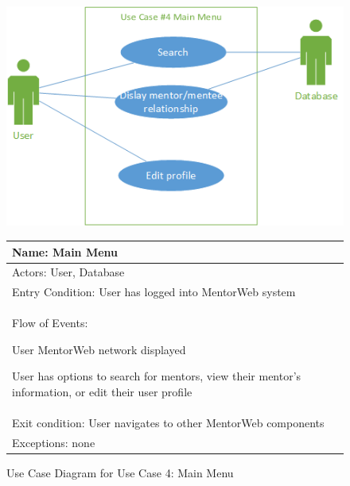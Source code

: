 \documentclass[11pt]{article}
\begin{document}
            \begin{figure}[H]
            \centering
            \includegraphics{UseCase4MainMenu}

				\begin{tabular}{|p{12 cm}|}
					\hline
					Name: Main Menu \\ \hline
					Actors: User, Database \\ \hline
					Entry Condition: User has logged into MentorWeb system
					\\ \hline
					Flow of Events:
					\begin{enumerate*}
						\item User MentorWeb network displayed
						\item User has options to search for mentors, view their
						mentor's information, or edit their user profile
					\end{enumerate*} \\ \hline
					Exit condition: User navigates to other MentorWeb components
					\\ \hline
					Exceptions: none \\ \hline
				\end{tabular}

            \caption{Use Case Diagram for Use Case 4: Main Menu}
            \label{UC4}
            \end{figure}
\end{document}
